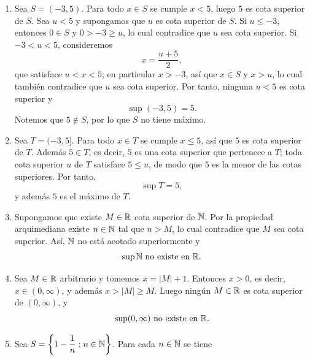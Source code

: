 \documentclass[12pt,a4paper]{article}
\newcommand{\llavesgrandes}[1]{\left\{#1\right\}}
\begin{document}
    \begin{solucion}
        \begin{enumerate}
            \item[(a)] Sea $S=(-3,5)$. Para todo $x\in S$ se cumple $x\lt5$, luego $5$ es cota superior de $S$. Sea $u\lt5$ y supongamos que $u$ es cota superior de $S$.
            Si $u\leq-3$, entonces $0\in S$ y $0\gt-3\geq u$, lo cual contradice que $u$ sea cota superior. Si $-3\lt u\lt5$, consideremos
            \begin{equation*}
                x=\frac{u+5}{2},
            \end{equation*}
            que satisface $u\lt x\lt5$; en particular $x\gt-3$, así que $x\in S$ y $x\gt u$, lo cual también contradice que $u$ sea cota superior.
            Por tanto, ninguna $u\lt5$ es cota superior y
            \begin{equation*}
                \sup(-3,5)=5.
            \end{equation*}
            Notemos que $5\notin S$, por lo que $S$ no tiene máximo.
            \item[(b)] Sea $T=(-3,5]$. Para todo $x\in T$ se cumple $x\leq5$, así que $5$ es cota superior de $T$. Además $5\in T$, es decir, $5$ es una cota superior que pertenece a $T$; toda cota superior $u$ de $T$ satisface $5\leq u$, de modo que $5$ es la menor de las cotas superiores. Por tanto,
            \begin{equation*}
                \sup T=5,
            \end{equation*}
            y además $5$ es el máximo de $T$.
            \item[(c)] Supongamos que existe $M\in\mathbb{R}$ cota superior de $\mathbb{N}$. Por la propiedad arquimediana existe $n\in\mathbb{N}$ tal que $n\gt M$, lo cual contradice que $M$ sea cota superior. Así, $\mathbb{N}$ no está acotado superiormente y
            \begin{equation*}
                \sup\mathbb{N}\ \text{no existe en }\mathbb{R}.
            \end{equation*}
            \item[(d)] Sea $M\in\mathbb{R}$ arbitrario y tomemos $x=|M|+1$. Entonces $x\gt0$, es decir, $x\in(0,\infty)$, y además $x\gt|M|\geq M$. Luego ningún $M\in\mathbb{R}$ es cota superior de $(0,\infty)$, y
            \begin{equation*}
                \sup(0,\infty)\ \text{no existe en }\mathbb{R}.
            \end{equation*}
            \item[(e)] Sea $S=\llavesgrandes{1-\dfrac{1}{n}:n\in\N}$. Para cada $n\in\mathbb{N}$ se tiene

\end{enumerate}
\end{solucion}
\end{document}
